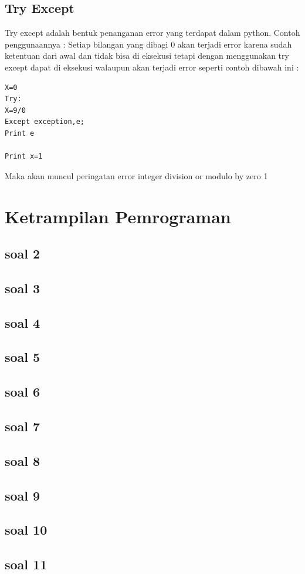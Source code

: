 \documentclass[12pt, times new roman, a4paper]{article}
\begin{document}
\subsection{Try Except}
Try except adalah bentuk penanganan error yang terdapat dalam python. Contoh penggunaannya : Setiap bilangan yang dibagi 0 akan terjadi error karena
sudah ketentuan dari awal dan tidak bisa di eksekusi tetapi dengan menggunakan try except dapat di eksekusi walaupun akan terjadi error seperti contoh
dibawah ini :\\
\begin{verbatim}
X=0
Try:
X=9/0
Except exception,e;
Print e

Print x=1
\end{verbatim}
Maka akan muncul peringatan error integer division or modulo by zero 1\\

\section{Ketrampilan Pemrograman}


\subsection{soal 2}

\subsection{soal 3}

\subsection{soal 4}

\subsection{soal 5}

\subsection{soal 6}

\subsection{soal 7}

\subsection{soal 8}

\subsection{soal 9}

\subsection{soal 10}

\subsection{soal 11}

\end{document}
